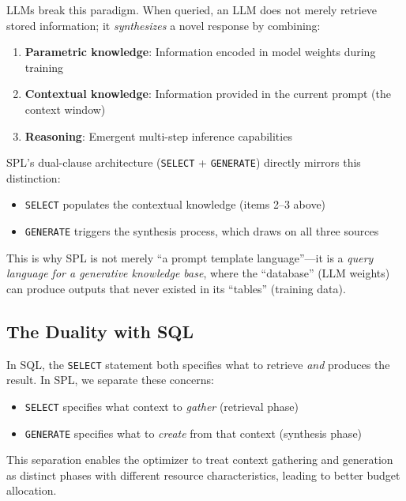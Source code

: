 \documentclass[11pt,a4paper]{article}
\begin{document}
LLMs break this paradigm. When queried, an LLM does not merely retrieve stored information; it \emph{synthesizes} a novel response by combining:

\begin{enumerate}[nosep]
  \item \textbf{Parametric knowledge}: Information encoded in model weights during training
  \item \textbf{Contextual knowledge}: Information provided in the current prompt (the context window)
  \item \textbf{Reasoning}: Emergent multi-step inference capabilities
\end{enumerate}

SPL's dual-clause architecture (\texttt{SELECT} + \texttt{GENERATE}) directly mirrors this distinction:

\begin{itemize}[nosep]
  \item \texttt{SELECT} populates the contextual knowledge (items 2--3 above)
  \item \texttt{GENERATE} triggers the synthesis process, which draws on all three sources
\end{itemize}

This is why SPL is not merely ``a prompt template language''---it is a \emph{query language for a generative knowledge base}, where the ``database'' (LLM weights) can produce outputs that never existed in its ``tables'' (training data).

\subsection{The Duality with SQL}

In SQL, the \texttt{SELECT} statement both specifies what to retrieve \emph{and} produces the result. In SPL, we separate these concerns:

\begin{itemize}[nosep]
  \item \texttt{SELECT} specifies what context to \emph{gather} (retrieval phase)
  \item \texttt{GENERATE} specifies what to \emph{create} from that context (synthesis phase)
\end{itemize}

This separation enables the optimizer to treat context gathering and generation as distinct phases with different resource characteristics, leading to better budget allocation.
\end{document}
